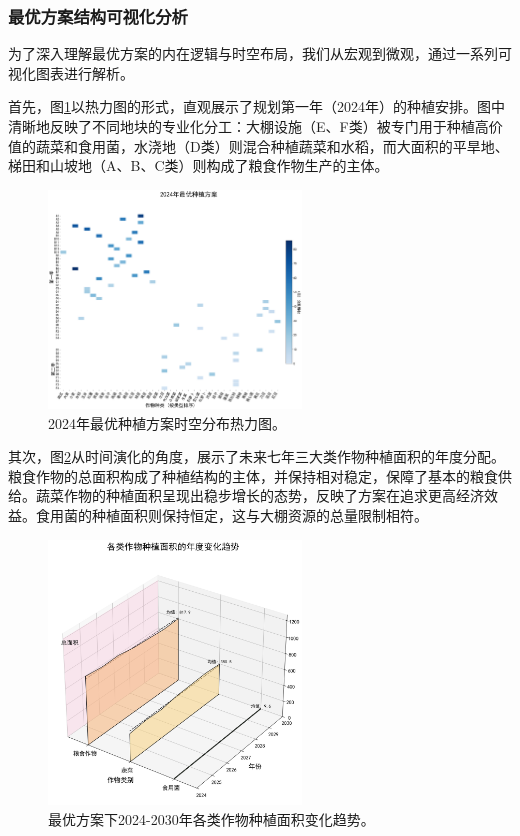 \subsubsection{最优方案结构可视化分析}
为了深入理解最优方案的内在逻辑与时空布局，我们从宏观到微观，通过一系列可视化图表进行解析。

首先，图\ref{fig:optimal_solution_2024}以热力图的形式，直观展示了规划第一年（2024年）的种植安排。图中清晰地反映了不同地块的专业化分工：大棚设施（E、F类）被专门用于种植高价值的蔬菜和食用菌，水浇地（D类）则混合种植蔬菜和水稻，而大面积的平旱地、梯田和山坡地（A、B、C类）则构成了粮食作物生产的主体。

\begin{figure}[H]
    \centering
    \includegraphics[width=0.6\textwidth]{figs/5问题三/2024年最优种植方案.png}
    \caption{2024年最优种植方案时空分布热力图。}
    \label{fig:optimal_solution_2024}
\end{figure}

其次，图\ref{fig:area_stack}从时间演化的角度，展示了未来七年三大类作物种植面积的年度分配。粮食作物的总面积构成了种植结构的主体，并保持相对稳定，保障了基本的粮食供给。蔬菜作物的种植面积呈现出稳步增长的态势，反映了方案在追求更高经济效益。食用菌的种植面积则保持恒定，这与大棚资源的总量限制相符。

\begin{figure}[H]
    \centering
    \includegraphics[width=0.6\textwidth]{figs/5问题三/年度种植面积3D图.png}
    \caption{最优方案下2024-2030年各类作物种植面积变化趋势。}
    \label{fig:area_stack}
\end{figure}

